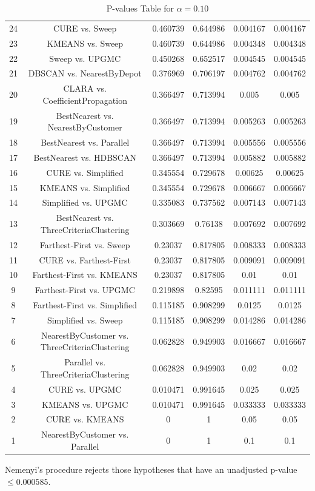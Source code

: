 \documentclass[a4paper,10pt]{article}
\begin{document}
\begin{landscape}
\begin{table}[!htp]
\begin{tabular}{cccccc}
24&CURE vs. Sweep&0.460739&0.644986&0.004167&0.004167\\
23&KMEANS vs. Sweep&0.460739&0.644986&0.004348&0.004348\\
22&Sweep vs. UPGMC&0.450268&0.652517&0.004545&0.004545\\
21&DBSCAN vs. NearestByDepot&0.376969&0.706197&0.004762&0.004762\\
20&CLARA vs. CoefficientPropagation&0.366497&0.713994&0.005&0.005\\
19&BestNearest vs. NearestByCustomer&0.366497&0.713994&0.005263&0.005263\\
18&BestNearest vs. Parallel&0.366497&0.713994&0.005556&0.005556\\
17&BestNearest vs. HDBSCAN&0.366497&0.713994&0.005882&0.005882\\
16&CURE vs. Simplified&0.345554&0.729678&0.00625&0.00625\\
15&KMEANS vs. Simplified&0.345554&0.729678&0.006667&0.006667\\
14&Simplified vs. UPGMC&0.335083&0.737562&0.007143&0.007143\\
13&BestNearest vs. ThreeCriteriaClustering&0.303669&0.76138&0.007692&0.007692\\
12&Farthest-First vs. Sweep&0.23037&0.817805&0.008333&0.008333\\
11&CURE vs. Farthest-First&0.23037&0.817805&0.009091&0.009091\\
10&Farthest-First vs. KMEANS&0.23037&0.817805&0.01&0.01\\
9&Farthest-First vs. UPGMC&0.219898&0.82595&0.011111&0.011111\\
8&Farthest-First vs. Simplified&0.115185&0.908299&0.0125&0.0125\\
7&Simplified vs. Sweep&0.115185&0.908299&0.014286&0.014286\\
6&NearestByCustomer vs. ThreeCriteriaClustering&0.062828&0.949903&0.016667&0.016667\\
5&Parallel vs. ThreeCriteriaClustering&0.062828&0.949903&0.02&0.02\\
4&CURE vs. UPGMC&0.010471&0.991645&0.025&0.025\\
3&KMEANS vs. UPGMC&0.010471&0.991645&0.033333&0.033333\\
2&CURE vs. KMEANS&0&1&0.05&0.05\\
1&NearestByCustomer vs. Parallel&0&1&0.1&0.1\\
\hline
\end{tabular}
\caption{P-values Table for $\alpha=0.10$}
\end{table}Nemenyi's procedure rejects those hypotheses that have an unadjusted p-value $\le0.000585$.


\end{landscape}
\end{document}
